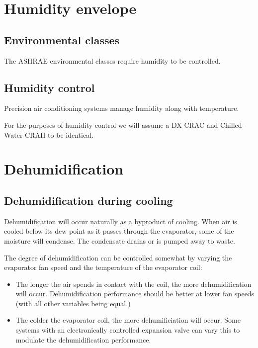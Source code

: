 \section{Humidity envelope}

\subsection{Environmental classes}

The ASHRAE environmental classes require humidity to be controlled.



\subsection{Humidity control}

Precision air conditioning systems manage humidity along with temperature.

For the purposes of humidity control we will assume a DX CRAC and Chilled-Water CRAH to be identical.

\section{Dehumidification}
\label{sec:dehumidification}

\subsection{Dehumidification during cooling}
\label{sec:dehumidification-during-cooling}

Dehumidification will occur naturally as a byproduct of cooling.
When air is cooled below its dew point as it passes through the evaporator, some of the moisture will condense.
The condensate drains or is pumped away to waste.

The degree of dehumidification can be controlled somewhat by varying the evaporator fan speed and the temperature of the evaporator coil:
\begin{itemize}
\item
  The longer the air spends in contact with the coil, the more dehumidification will occur.
  Dehumidification performance should be better at lower fan speeds (with all other variables being equal.)
\item
  The colder the evaporator coil, the more dehumificiation will occur.
  Some systems with an electronically controlled expansion valve can vary this to modulate the dehumidification performance.
\end{itemize}

